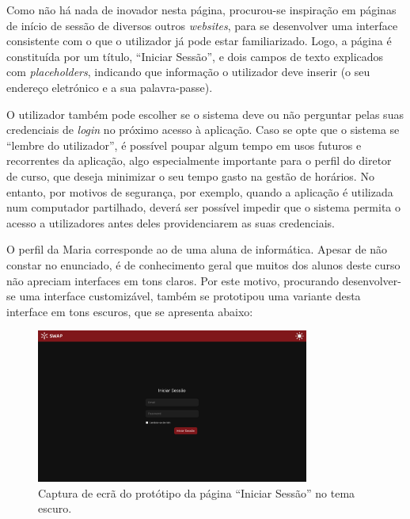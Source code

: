 \documentclass[12pt, a4paper]{article}
\begin{document}
Como não há nada de inovador nesta página, procurou-se inspiração em páginas de início de sessão de
diversos outros \emph{websites}, para se desenvolver uma interface consistente com o que o
utilizador já pode estar familiarizado. Logo, a página é constituída por um título, ``Iniciar
Sessão'', e dois campos de texto explicados com \emph{placeholders}, indicando que informação o
utilizador deve inserir (o seu endereço eletrónico e a sua palavra-passe).

O utilizador também pode escolher se o sistema deve ou não perguntar pelas suas credenciais de
\emph{login} no próximo acesso à aplicação. Caso se opte que o sistema se ``lembre do utilizador'',
é possível poupar algum tempo em usos futuros e recorrentes da aplicação, algo especialmente
importante para o perfil do diretor de curso, que deseja minimizar o seu tempo gasto na gestão de
horários. No entanto, por motivos de segurança, por exemplo, quando a aplicação é utilizada num
computador partilhado, deverá ser possível impedir que o sistema permita o acesso a utilizadores
antes deles providenciarem as suas credenciais.

O perfil da Maria corresponde ao de uma aluna de informática. Apesar de não constar no enunciado, é
de conhecimento geral que muitos dos alunos deste curso não apreciam interfaces em tons claros. Por
este motivo, procurando desenvolver-se uma interface customizável, também se prototipou uma variante
desta interface em tons escuros, que se apresenta abaixo:

\begin{figure}[H]
    \centering
    \includegraphics[width=0.8\textwidth]{res/prototype/iniciar-sessao-dark.png}
    \caption{Captura de ecrã do protótipo da página ``Iniciar Sessão'' no tema escuro.}
    \label{iniciar-sessao-dark}
\end{figure}
\end{document}
